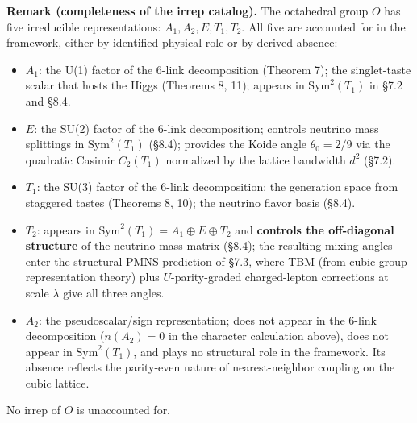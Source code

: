 \documentclass[
]{article}
\providecommand{\tightlist}{%
  \setlength{\itemsep}{0pt}\setlength{\parskip}{0pt}}
\begin{document}
\textbf{Remark (completeness of the irrep catalog).} The octahedral
group \(O\) has five irreducible representations:
\(A_1, A_2, E, T_1, T_2\). All five are accounted for in the framework,
either by identified physical role or by derived absence:

\begin{itemize}
\tightlist
\item
  \(A_1\): the U(1) factor of the 6-link decomposition (Theorem 7); the
  singlet-taste scalar that hosts the Higgs (Theorems 8, 11); appears in
  \(\text{Sym}^2(T_1)\) in §7.2 and §8.4.
\item
  \(E\): the SU(2) factor of the 6-link decomposition; controls neutrino
  mass splittings in \(\text{Sym}^2(T_1)\) (§8.4); provides the Koide
  angle \(\theta_0 = 2/9\) via the quadratic Casimir \(C_2(T_1)\)
  normalized by the lattice bandwidth \(d^2\) (§7.2).
\item
  \(T_1\): the SU(3) factor of the 6-link decomposition; the generation
  space from staggered tastes (Theorems 8, 10); the neutrino flavor
  basis (§8.4).
\item
  \(T_2\): appears in \(\text{Sym}^2(T_1) = A_1 \oplus E \oplus T_2\)
  and \textbf{controls the off-diagonal structure} of the neutrino mass
  matrix (§8.4); the resulting mixing angles enter the structural PMNS
  prediction of §7.3, where TBM (from cubic-group representation theory)
  plus \(U\)-parity-graded charged-lepton corrections at scale
  \(\lambda\) give all three angles.
\item
  \(A_2\): the pseudoscalar/sign representation; does not appear in the
  6-link decomposition (\(n(A_2) = 0\) in the character calculation
  above), does not appear in \(\text{Sym}^2(T_1)\), and plays no
  structural role in the framework. Its absence reflects the parity-even
  nature of nearest-neighbor coupling on the cubic lattice.
\end{itemize}

No irrep of \(O\) is unaccounted for.
\end{document}
